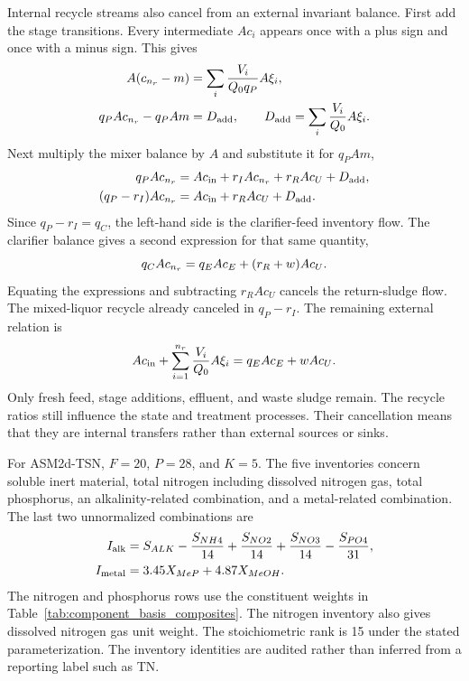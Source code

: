 Internal recycle streams also cancel from an external invariant balance. First add the stage transitions. Every intermediate $Ac_i$ appears once with a plus sign and once with a minus sign. This gives
\begin{align}
\equationname{Accumulated invariant change across the reactor train}
A(c_{n_r}-m)&=\sum_i\frac{V_i}{Q_0q_P}A\xi_i,\\
\equationname{Reactor-train invariant equation and external-addition total}
q_PAc_{n_r}-q_PAm&=D_{\rm add},\qquad
D_{\rm add}=\sum_i\frac{V_i}{Q_0}A\xi_i.
\end{align}
Next multiply the mixer balance by $A$ and substitute it for $q_PAm$,
\begin{align}
\equationname{Reactor-train invariant equation after mixer substitution}
q_PAc_{n_r}&=Ac_{\rm in}+r_IAc_{n_r}+r_RAc_U+D_{\rm add},\\
\equationname{Invariant equation after cancellation of mixed-liquor recycle}
(q_P-r_I)Ac_{n_r}&=Ac_{\rm in}+r_RAc_U+D_{\rm add}.
\end{align}
Since $q_P-r_I=q_C$, the left-hand side is the clarifier-feed inventory flow. The clarifier balance gives a second expression for that same quantity,
\begin{equation}
\equationname{Clarifier-feed invariant flow equals the two outlet invariant flows}
q_CAc_{n_r}=q_EAc_E+(r_R+w)Ac_U.
\end{equation}
Equating the expressions and subtracting $r_RAc_U$ cancels the return-sludge flow. The mixed-liquor recycle already canceled in $q_P-r_I$. The remaining external relation is
\begin{equation}
\equationname{External plant mass conservation after internal recycle cancellation}
Ac_{\rm in}+\sum_{i=1}^{n_r}\frac{V_i}{Q_0}A\xi_i
=q_EAc_E+wAc_U.
\label{eq:plant_external_invariant}
\end{equation}
Only fresh feed, stage additions, effluent, and waste sludge remain. The recycle ratios still influence the state and treatment processes. Their cancellation means that they are internal transfers rather than external sources or sinks.

For ASM2d-TSN, $F=20$, $P=28$, and $K=5$. The five inventories concern soluble inert material, total nitrogen including dissolved nitrogen gas, total phosphorus, an alkalinity-related combination, and a metal-related combination. The last two unnormalized combinations are
\begin{align}
\equationname{Alkalinity-related invariant combination}
I_{\rm alk}&=S_{ALK}-\frac{S_{NH4}}{14}
+\frac{S_{NO2}}{14}+\frac{S_{NO3}}{14}-\frac{S_{PO4}}{31},\\
\equationname{Metal-related invariant combination}
I_{\rm metal}&=3.45X_{MeP}+4.87X_{MeOH}.
\label{eq:plant_named_invariants}
\end{align}
The nitrogen and phosphorus rows use the constituent weights in Table~\ref{tab:component_basis_composites}. The nitrogen inventory also gives dissolved nitrogen gas unit weight. The stoichiometric rank is 15 under the stated parameterization. The inventory identities are audited rather than inferred from a reporting label such as TN.

